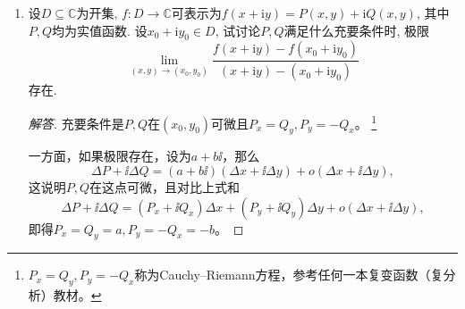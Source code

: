 \begin{1b}
\begin{enumerate}
提示: 先证明对充分大的\(s\), \(\boldsymbol{A}(s)\)的特征值互不相同.
\begin{proof}
先证当\(s\)充分大时, \(\boldsymbol{A}(s)\)有\(n\)个不同的特征值. 
不妨记\(\boldsymbol{A}=(a_{ij})\), 由Gerschgorin圆盘第一定理, 
可知\(\boldsymbol{A}(s)\)的特征值落在下列圆盘中:
\[D_i=\left|z-a_{ii}-s^i\right|\leqslant R_i
=\sum_{j=1,j\ne i}^{n}|a_{ij}|,\quad 1\leqslant i\leqslant n.\]
取\(s\)充分大, 使得\(s^n\gg s^{n-1}\gg \cdots\gg s\). 
注意到\(R_i\)的值固定, 故\(D_i\)的圆心之间的距离大于半径\(R_i\), 
从而\(D_i\)互不相交, 各自构成了一个连通分支. 
再由第二圆盘定理, 每个连通分支\(D_i\)中有且仅有一个特征值, 
于是\(\boldsymbol{A}(s)\)有\(n\)个不同的特征值.

设\(f_s(\lambda)=\left|\lambda\boldsymbol{I}_n-\boldsymbol{A}(s)\right|\)
是\(\boldsymbol{A}(s)\)的特征多项式, 
则其判别式\(\Delta\left(f_s(\lambda)\right)\)是关于\(s\)的多项式. 
由前面的讨论可知, 当\(s\)充分大时, \(f_s(\lambda)\)无重根, 
从而\(\Delta\left(f_s(\lambda)\right)\ne 0\), 
即\(\Delta\left(f_s(\lambda)\right)\)是关于\(s\)的非零多项式. 

若\(\Delta\left(f_s(\lambda)\right)\)的所有复根都是零, 则任取一个正数\(\delta\); 
若\(\Delta\left(f_s(\lambda)\right)\)的复根不全为零, 则可取\(\delta\)为\(\Delta\left(f_s(\lambda)\right)\)的非零复根的模长的最小值. 
于是对任意的\(s\in(0,\delta)\), \(s\)都不是\(\Delta\left(f_s(\lambda)\right)\)的根, 
即\(\Delta\left(f_s(\lambda)\right)\ne 0\), 
从而\(f_s(\lambda)\)都无重根, 即\(\boldsymbol{A}(s)\)都有\(n\)个不同的特征值.
\end{proof}
\item 设\(D\subseteq\mathbb{C}\)为开集, \(f:D\rightarrow\mathbb{C}\)可表示为\(f(x+\mathrm{i}y)=P(x,y)+\mathrm{i}Q(x,y)\), 其中\(P,Q\)均为实值函数. 
设\(x_0+\mathrm{i}y_0\in D\), 试讨论\(P,Q\)满足什么充要条件时, 极限
\[\lim_{(x,y)\rightarrow(x_0,y_0)}\frac{f(x+\mathrm{i}y)-f(x_0+\mathrm{i}y_0)}{(x+\mathrm{i}y)-(x_0+\mathrm{i}y_0)}\]存在.
\begin{proof}[解答]
	充要条件是$P,Q$在$(x_0,y_0)$可微且$P_x=Q_y,P_y=-Q_x$。
    \footnote{$P_x=Q_y,P_y=-Q_x$称为Cauchy--Riemann方程，参考任何一本复变函数（复分析）教材。}
    \printfootnotes
    
    一方面，如果极限存在，设为$a+b\ii$，那么
    \[\Delta P+\ii\Delta Q=(a+b\ii)(\Delta x+\ii\Delta y)+o(\Delta x+\ii\Delta y),\]
    这说明$P,Q$在这点可微，且对比上式和
    \[\Delta P+\ii\Delta Q=(P_x+\ii Q_x)\Delta x+(P_y+\ii Q_y)\Delta y+o(\Delta x+\ii\Delta y),\]
    即得$P_x=Q_y=a,P_y=-Q_x=-b$。
    

\end{proof}
\end{enumerate}
\end{1b}
